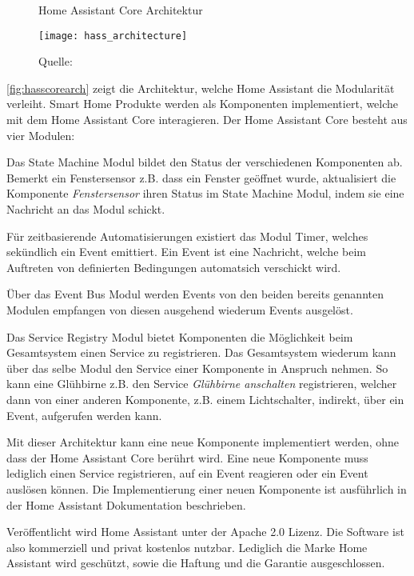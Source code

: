 \begin{figure}[ht]
	\centering
	\caption{Home Assistant Core Architektur}
	\texttt{[image: hass\_architecture]}
	\caption*{\footnotesize{Quelle: }}
	\label{fig:hasscorearch}
\end{figure}

\autoref{fig:hasscorearch} zeigt die Architektur, welche Home Assistant die Modularität verleiht.
Smart Home Produkte werden als Komponenten implementiert, welche mit dem Home Assistant Core interagieren.
Der Home Assistant Core besteht aus vier Modulen:

Das State Machine Modul bildet den Status der verschiedenen Komponenten ab.
Bemerkt ein Fenstersensor z.B. dass ein Fenster geöffnet wurde, aktualisiert die Komponente \textit{Fenstersensor} ihren Status im State Machine Modul, indem sie eine Nachricht an das Modul schickt.

Für zeitbasierende Automatisierungen existiert das Modul Timer, welches sekündlich ein Event emittiert.
Ein Event ist eine Nachricht, welche beim Auftreten von definierten Bedingungen automatsich verschickt wird.

Über das Event Bus Modul werden Events von den beiden bereits genannten Modulen empfangen von diesen ausgehend wiederum Events ausgelöst.

Das Service Registry Modul bietet Komponenten die Möglichkeit beim Gesamtsystem einen Service zu registrieren.
Das Gesamtsystem wiederum kann über das selbe Modul den Service einer Komponente in Anspruch nehmen.
So kann eine Glühbirne z.B. den Service \textit{Glühbirne anschalten} registrieren, welcher dann von einer anderen Komponente, z.B. einem Lichtschalter, indirekt, über ein Event, aufgerufen werden kann.

Mit dieser Architektur kann eine neue Komponente implementiert werden, ohne dass der Home Assistant Core berührt wird.
Eine neue Komponente muss lediglich einen Service registrieren, auf ein Event reagieren oder ein Event auslösen können.
Die Implementierung einer neuen Komponente ist ausführlich in der Home Assistant Dokumentation beschrieben.

Veröffentlicht wird Home Assistant unter der Apache 2.0 Lizenz.
Die Software ist also kommerziell und privat kostenlos nutzbar.
Lediglich die Marke Home Assistant wird geschützt, sowie die Haftung und die Garantie ausgeschlossen.

